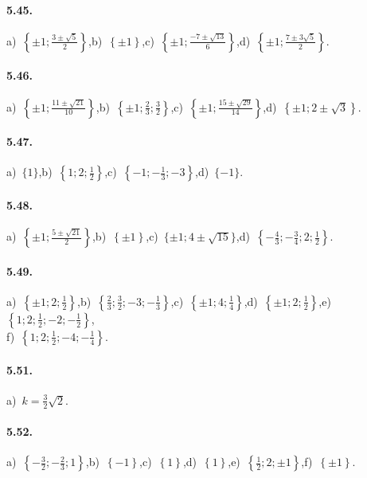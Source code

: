 \paragraph{5.45.} a)~$\left\{\pm 1;\frac{3\pm \sqrt 5} 2\right\}$,\quad b)~$\left\{\pm 1\right\}$,\quad c)~$\left\{\pm 1;\frac{-7\pm \sqrt{13}} 6\right\}$,\quad d)~$\left\{\pm 1;\frac{7\pm 3\sqrt 5} 2\right\}$.

\paragraph{5.46.} a)~$\left\{\pm 1;\frac{11\pm \sqrt{21}}{10}\right\}$,\quad b)~$\left\{\pm 1;\frac 2 3;\frac 3 2\right\}$,\quad c)~$\left\{\pm 1;\frac{15\pm \sqrt{29}}{14}\right\}$,\quad d)~$\left\{\pm 1;2\pm \sqrt 3\right\}$.

\paragraph{5.47.} a)~$\{1\}$,\quad b)~$\left\{1; 2; \frac 1 2\right\}$,\quad c)~$\left\{-1; -\frac{1}{3}; -3\right\}$,\quad d)~$\{-1\}$.

\paragraph{5.48.} a)~$\left\{\pm 1;\frac{5\pm \sqrt{21}} 2\right\}$,\quad b)~$\left\{\pm 1\right\}$,\quad c)~$\{\pm 1;4\pm \sqrt{15}\}$,\quad d)~$\left\{-\frac{4}{3}; -\frac{3}{4}; 2; \frac{1}{2}\right\}$.

\paragraph{5.49.} a)~$\left\{\pm 1; 2; \frac 1 2\right\}$,\quad b)~$\left\{\frac 2 3; \frac{3}{2}; -3; -\frac{1}{3}\right\}$,\quad c)~$\left\{\pm 1; 4; \frac 1 4\right\}$,\quad d)~$\left\{\pm 1; 2; \frac 1 2\right\}$,\quad e)~$\left\{1; 2; \frac 1 2; -2; -\frac 1 2\right\}$,\protect\\ f)~$\left\{1; 2; \frac{1}{2}; -4; -\frac{1}{4}\right\}$.

\paragraph{5.51.} a)~$k=\frac 3 2\sqrt 2$.

\paragraph{5.52.} a)~$\left\{-\frac 3 2;-\frac 2 3;1\right\}$,\quad b)~$\left\{-1\right\}$,\quad c)~$\left\{1\right\}$,\quad d)~$\left\{1\right\}$,\quad e)~$\left\{\frac 1 2;2;\pm 1\right\}$,\quad f)~$\left\{\pm 1\right\}$.

